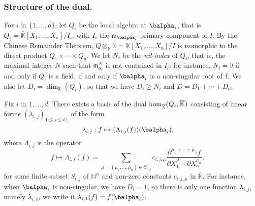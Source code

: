 \documentclass[12pt]{article}
\def\N {\ensuremath{\mathbb{N}}}
\def\K {\ensuremath{\mathbb{K}}}
\def\Kbar {{\ensuremath{\overline{\mathbb{K}}}}}
\def\D {\ensuremath{D}}
\def\m {\ensuremath{\mathfrak{m}}}
\def\K{\mathbb{K}}
\begin{document}
\subsubsection{Structure of the dual.}
For $i$ in $\{1,\dots,d\}$, let $Q_i$ be the local algebra at
$\balpha_i$, that is $Q_i=\Kbar[X_1,\dots,X_n]/I_i$, with $I_i$ the
$\m_{\balpha_i}$-primary component of $I$. By the Chinese Remainder
Theorem, $Q\otimes_\K \Kbar=\Kbar[X_1,\dots,X_n]/I$ is isomorphic to
the direct product $Q_1\times \cdots \times Q_d$.  We let $N_i$ be the
{\em nil-index} of $Q_i$, that is, the maximal integer $N$ such that
$\m_{\alpha_i}^N$ is not contained in $I_i$; for instance, $N_i=0$ if
and only if $Q_i$ is a field, if and only if $\balpha_i$ is a
non-singular root of $I$. We also let
$\D_i=\dim_\Kbar(Q_i)$, so that we have $D_i \ge N_i$ and $\D=\D_1 + \cdots + \D_d$.

Fix $i$ in $1,\dots,d$.  There exists a basis of the dual ${\rm
	hom}_\Kbar(Q_i,\Kbar)$ consisting of linear forms
$(\lambda_{i,j})_{1\le j \le \D_i}$ of the form
$$\lambda_{i,j}: f \mapsto (\Lambda_{i,j}(f))(\balpha_i),$$
where $\Lambda_{i,j}$ is the operator
$$f \mapsto \Lambda_{i,j}(f) = \sum_{\mu=(\mu_1,\dots,\mu_n) \in
	S_{i,j}} c_{i,j,\mu} \frac{ \partial^{\mu_1 + \cdots + \mu_n} f}
{\partial X_1^{\mu_1} \cdots \partial X_n^{\mu_n}},$$ for some finite
subset $S_{i,j}$ of $\N^n$ and non-zero constants $c_{i,j,\mu}$ in
$\Kbar$. 
For instance, when $\balpha_i$ is non-singular, we have $D_i=1$, so
there is only one function $\lambda_{i,j}$, namely $\lambda_{i,1}$, we
write it $\lambda_{i,1}(f) = f(\balpha_i)$.
\end{document}
